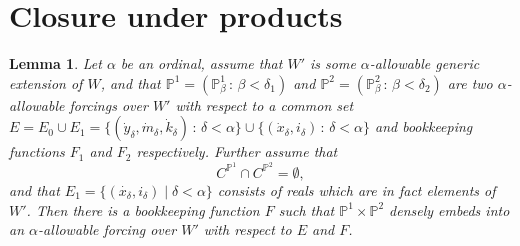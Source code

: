 \documentclass[a4paper,11pt]{article}
\newtheorem{lemma}[theorem]{Lemma}
\newcommand{\forceP}{\mathbb{P}}
\begin{document}
\section{Closure under products}

\begin{lemma}\label{productallowable}
Let $\alpha$ be an ordinal, assume that $W'$ is some $\alpha$-allowable generic extension of $W$, and that $\forceP^1=(\forceP^1_{\beta} \,: \,\beta < \delta_1)$ and $\forceP^2=(\forceP^2_{\beta} \,: \, \beta < \delta_2) $ are two $\alpha$-allowable forcings over $W'$ with respect to a common set $E=E_0 \cup E_1=\{(\dot{y}_{\delta},\dot{m}_{\delta}, \dot{k}_{\delta}) \,: \, \delta < \alpha\} \cup \{ (\dot{x}_{\delta},i_{\delta}) \, : \, \delta < \alpha \}$  and bookkeeping functions $F_1$ and $F_2$ respectively. Further assume that 
\[ C^{\forceP^1} \cap C^{\forceP^2} = \emptyset, \]
and that $E_1= \{ (\dot{x_{\delta}},i_{\delta}) \mid \delta < \alpha \}$ consists of reals which are in fact elements of $W'$.
Then there is a bookkeeping function $F$ such that $\forceP^1 \times \forceP^2$ densely embeds into an $\alpha$-allowable forcing over $W'$ with respect to $E$ and $F$.
\end{lemma}
\end{document}
